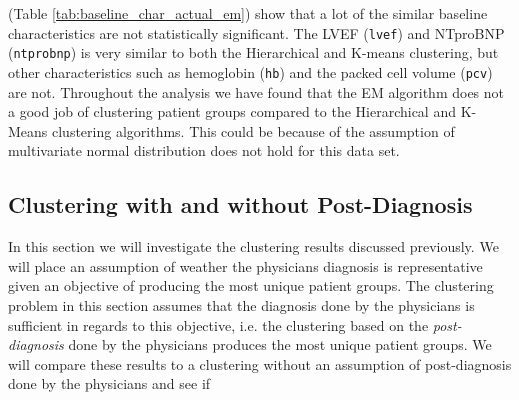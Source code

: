 \documentclass[../thesis.tex]{subfiles}
\begin{document}


\noindent (Table \ref{tab:baseline_char_actual_em}) show that a lot of the similar baseline characteristics are not statistically significant. The LVEF (\texttt{lvef}) and NTproBNP (\texttt{ntprobnp}) is very similar to both the Hierarchical and K-means clustering, but other characteristics such as hemoglobin (\texttt{hb}) and the packed cell volume (\texttt{pcv}) are not. Throughout the analysis we have found that the EM algorithm does not a good job of clustering patient groups compared to the Hierarchical and K-Means clustering algorithms. This could be because of the assumption of multivariate normal distribution does not hold for this data set.

\subsection{Clustering with and without Post-Diagnosis}

\noindent In this section we will investigate the clustering results discussed previously. We will place an assumption of weather the physicians diagnosis is representative given an objective of producing the most unique patient groups. The clustering problem in this section assumes that the diagnosis done by the physicians is sufficient in regards to this objective, i.e. the clustering based on the \textit{post-diagnosis} done by the physicians produces the most unique patient groups. We will compare these results to a clustering without an assumption of post-diagnosis done by the physicians and see if 


\end{document}
